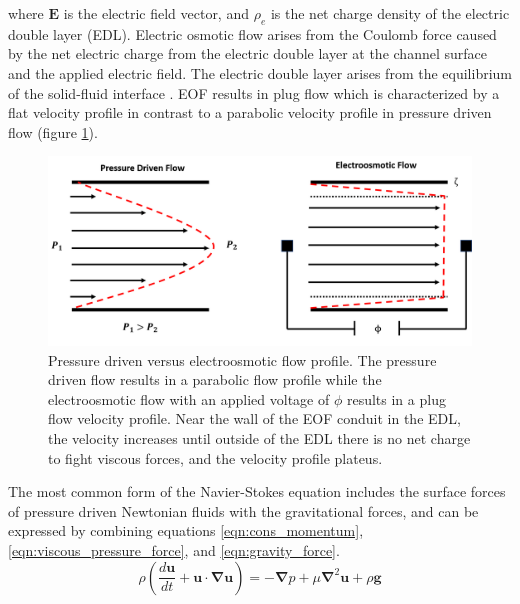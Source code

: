 \noindent where $\boldsymbol{E}$ is the electric field vector, and $\rho_e$ is the net charge density of the electric double layer (EDL). Electric osmotic flow arises from the Coulomb force caused by the net electric charge from the electric double layer at the channel surface and the applied electric field. The electric double layer arises from the equilibrium of the solid-fluid interface \cite{kirby_micro-and_2010}. EOF results in plug flow which is characterized by a flat velocity profile in contrast to a parabolic velocity profile in pressure driven flow (figure \ref{fig:plug_vs_parabolic_flow}).

\begin{figure}[ht]
    \centering
    \includegraphics[width = \textwidth]{images/plugVsParabolic.png}
    \caption[Pressure driven versus electroosmotic flow profile]{Pressure driven versus electroosmotic flow profile. The pressure driven flow results in a parabolic flow profile while the electroosmotic flow with an applied voltage of $\phi$ results in a plug flow velocity profile. Near the wall of the EOF conduit in the EDL, the velocity increases until outside of the EDL there is no net charge to fight viscous forces, and the velocity profile plateus.}
    \label{fig:plug_vs_parabolic_flow}
\end{figure}

\par The most common form of the Navier-Stokes equation includes the surface forces of pressure driven Newtonian fluids with the gravitational forces, and can be expressed by combining equations \ref{eqn:cons_momentum}, \ref{eqn:viscous_pressure_force}, and \ref{eqn:gravity_force}. 
\begin{equation}
    \rho(\frac{d\textbf{u}}{dt} + \textbf{u}\cdot\boldsymbol{\nabla}\textbf{u}) = -\boldsymbol{\nabla}p + \mu\boldsymbol{\nabla}^2\textbf{u} + \rho \textbf{g}
    \label{eqn:navier_stokes}
\end{equation}

